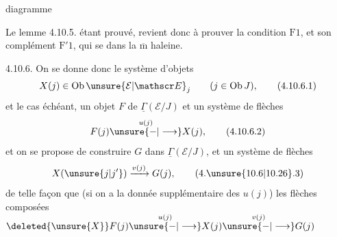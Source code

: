 diagramme

Le lemme 4.10.5. étant prouvé,  revient donc à prouver la condition $\mathrm F1$, et son complément $\mathrm F'1$, qui se  dans la $\overline{\mathrm m}$ haleine.

4.10.6. On se donne donc le système d'objets
\[
 X(j)\in\operatorname{Ob}\unsure{\mathcal E|\mathscr E}_j\qquad (j\in\operatorname{Ob}J), \tag*{(4.10.6.1)}
\]
et le cas échéant, un objet $F$ de $\underline{\Gamma}(\mathcal E/J)$ et un système de flèches
\[
 F(j)\overset{u(j)}{\unsure{\mathbin{-}|\longrightarrow}}X(j), \tag*{(4.10.6.2)}
\]
et on se propose de construire $G$ dans $\underline{\Gamma}(\mathcal E/J)$, et un système de flèches
\[
 X(\unsure{j|j'})\xrightarrow{v(j)}G(j), \tag*{(4.\unsure{10.6|10.26}.3)}
\]
de telle façon que (si on a la donnée supplémentaire des $u(j)$) les flèches composées $\deleted{\unsure{X}}F(j)\overset{u(j)}{\unsure{\mathbin{-}|\longrightarrow}}X(j)\overset{v(j)}{\unsure{\mathbin{-}|\longrightarrow}}G(j)$
